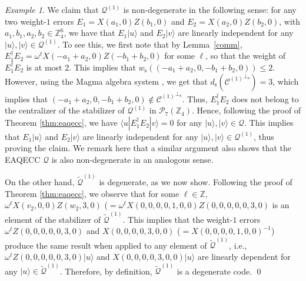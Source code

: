 \documentclass{article}
\theoremstyle{remark}
\newtheorem{ex}{Example}[section]
\theoremstyle{definition}
\numberwithin{equation}{section}
\begin{document}
\begin{ex}
We claim that $\mathcal{Q}^{(1)}$ is non-degenerate in the following sense: for any two weight-$1$ errors $E_1=X(a_1,0)Z(b_1,0)$ and $E_2=X(a_2,0)Z(b_2,0)$, with $a_1,b_1,a_2,b_2 \in \mathbb{Z}_4^6$, we have that $ E_1 | u \rangle$ and $E_2 | v \rangle$ are linearly independent for any $| u \rangle, | v \rangle \in \mathcal{Q}^{(1)}$. To see this, we first note that by Lemma~\ref{comm}, $E_1^{\dag}E_2 = \omega^{\ell}X(-a_1+a_2,0)Z(-b_1+b_2,0)$ for some $\ell$, so that the weight of $E_1^{\dag}E_2$ is at most 2. This implies that $w_{\mathrm{s}}((-a_1+a_2,0,-b_1+b_2,0)) \leq 2.$ However, using the Magma algebra system \cite{bosma}, we get that $d_{\mathrm{s}}({\mathcal{C}^{(1)}}^{\perp_{\mathrm{s}}})=3$, which implies that $(-a_1+a_2,0,-b_1+b_2,0)\not\in{\mathcal{C}^{(1)}}^{\perp_{\mathrm{s}}}$. Thus, $E_1^{\dag}E_2$ does not belong to the centralizer of the stabilizer of $\mathcal{Q}^{(1)}$ in $\mathcal{P}_{7}(\mathbb{Z}_4)$. Hence, following the proof of Theorem \ref{thm:eaqecc}, we have $\langle u | E_1^{\dag}E_2| v \rangle=0$ for any $| u \rangle,| v \rangle \in \mathcal{Q}.$ This implies that $E_1| u \rangle$ and $E_2| v \rangle$  are linearly independent  for any $| u \rangle,| v \rangle \in \mathcal{Q}^{(1)}$, thus proving the claim. We remark here that a similar argument also shows that the EAQECC $\mathcal{Q}$ is also non-degenerate in an analogous sense.
 
On the other hand, $\widetilde{\mathcal{Q}}^{(1)}$ is degenerate, as we now show. Following the proof of Theorem \ref{thm:eaqecc}, we observe that for some $\ell \in \mathbb{Z}$, $\omega^\ell X(v_2,0,0)Z(w_2,3,0)$  ($= \omega^\ell X(0,0,0,0,1,0,0)Z(0,0,0,0,0,3,0)$ is an element of the stabilizer of $\widetilde{\mathcal{Q}}^{(1)}$. This implies that the weight-$1$ errors $\omega^\ell Z(0,0,0,0,0,3,0)$ and $X(0,0,0,0,3,0,0)$ ($=X(0,0,0,0,1,0,0)^{-1}$) produce the same result when applied to any element of $\widetilde{\mathcal{Q}}^{(1)}$, i.e.,  $\omega^\ell Z(0,0,0,0,0,3,0)| u \rangle$ and $X(0,0,0,0,3,0,0)| u \rangle$  are linearly dependent  for any $| u \rangle \in \widetilde{\mathcal{Q}}^{(1)}$. Therefore, by definition, $\widetilde{\mathcal{Q}}^{(1)}$ is a degenerate code. \qed
\end{ex}
\end{document}
